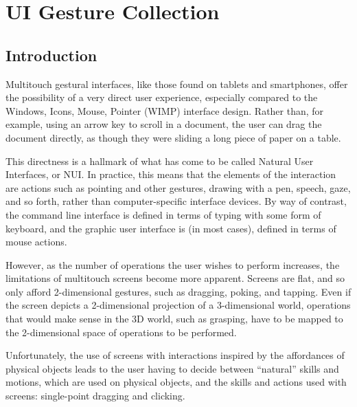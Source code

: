\section{UI Gesture Collection}
\subsection{Introduction}

Multitouch gestural interfaces, like those found on tablets and smartphones, offer the possibility of a very direct user experience, especially compared to the Windows, Icons, Mouse, Pointer (WIMP) interface design. 
Rather than, for example, using an arrow key to scroll in a document, the user can drag the document directly, as though they were sliding a long piece of paper on a table. 

This directness is a hallmark of what has come to be called Natural User Interfaces, or NUI. 
In practice, this means that the elements of the interaction are actions such as pointing and other gestures, drawing with a pen, speech, gaze, and so forth, rather than computer-specific interface devices. 
By way of contrast, the command line interface is defined in terms of typing with some form of keyboard, and the graphic user interface is (in most cases), defined in terms of mouse actions. 

However, as the number of operations the user wishes to perform increases, the limitations of multitouch screens become more apparent. 
Screens are flat, and so only afford 2-dimensional gestures, such as dragging, poking, and tapping. 
Even if the screen depicts a 2-dimensional projection of a 3-dimensional world, operations that would make sense in the 3D world, such as grasping, have to be mapped to the 2-dimensional space of operations to be performed. 

Unfortunately, the use of screens with interactions inspired by the affordances of physical objects leads to the user having to decide between ``natural'' skills and motions, which are used on physical objects, and the skills and actions used with screens: single-point dragging and clicking. 

